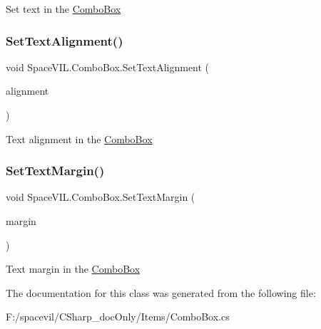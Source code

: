 Set text in the \mbox{\hyperlink{class_space_v_i_l_1_1_combo_box}{Combo\+Box}} 

\mbox{\label{class_space_v_i_l_1_1_combo_box_a43bcc26da1d80a462c541aea0a830b56}} 
\subsubsection{\texorpdfstring{Set\+Text\+Alignment()}{SetTextAlignment()}}
{\footnotesize\ttfamily void Space\+V\+I\+L.\+Combo\+Box.\+Set\+Text\+Alignment (\begin{DoxyParamCaption}\item[{Item\+Alignment}]{alignment }\end{DoxyParamCaption})}



Text alignment in the \mbox{\hyperlink{class_space_v_i_l_1_1_combo_box}{Combo\+Box}} 

\mbox{\label{class_space_v_i_l_1_1_combo_box_ad770a207c2e8525603e55f584605299b}} 
\subsubsection{\texorpdfstring{Set\+Text\+Margin()}{SetTextMargin()}}
{\footnotesize\ttfamily void Space\+V\+I\+L.\+Combo\+Box.\+Set\+Text\+Margin (\begin{DoxyParamCaption}\item[{\mbox{\hyperlink{struct_space_v_i_l_1_1_decorations_1_1_indents}{Indents}}}]{margin }\end{DoxyParamCaption})}



Text margin in the \mbox{\hyperlink{class_space_v_i_l_1_1_combo_box}{Combo\+Box}} 



The documentation for this class was generated from the following file\+:\begin{DoxyCompactItemize}
\item 
F\+:/spacevil/\+C\+Sharp\+\_\+doc\+Only/\+Items/Combo\+Box.\+cs\end{DoxyCompactItemize}
